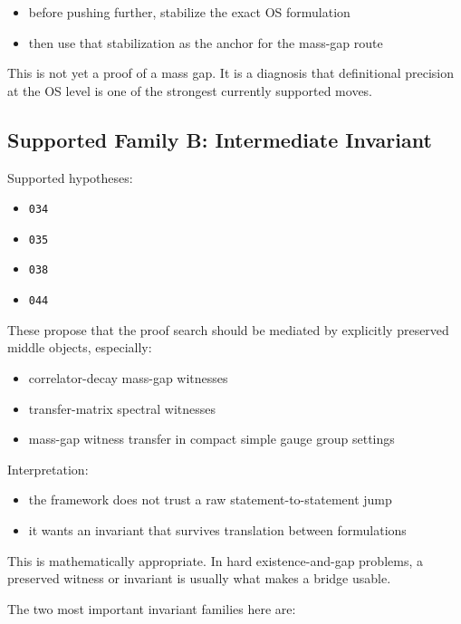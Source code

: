 \documentclass[
]{article}
\providecommand{\tightlist}{%
  \setlength{\itemsep}{0pt}\setlength{\parskip}{0pt}}
\begin{document}
\begin{itemize}
\tightlist
\item
  before pushing further, stabilize the exact OS formulation
\item
  then use that stabilization as the anchor for the mass-gap route
\end{itemize}

This is not yet a proof of a mass gap. It is a diagnosis that
definitional precision at the OS level is one of the strongest currently
supported moves.

\subsection{Supported Family B: Intermediate
Invariant}\label{supported-family-b-intermediate-invariant}

Supported hypotheses:

\begin{itemize}
\tightlist
\item
  \texttt{034}
\item
  \texttt{035}
\item
  \texttt{038}
\item
  \texttt{044}
\end{itemize}

These propose that the proof search should be mediated by explicitly
preserved middle objects, especially:

\begin{itemize}
\tightlist
\item
  correlator-decay mass-gap witnesses
\item
  transfer-matrix spectral witnesses
\item
  mass-gap witness transfer in compact simple gauge group settings
\end{itemize}

Interpretation:

\begin{itemize}
\tightlist
\item
  the framework does not trust a raw statement-to-statement jump
\item
  it wants an invariant that survives translation between formulations
\end{itemize}

This is mathematically appropriate. In hard existence-and-gap problems,
a preserved witness or invariant is usually what makes a bridge usable.

The two most important invariant families here are:
\end{document}
